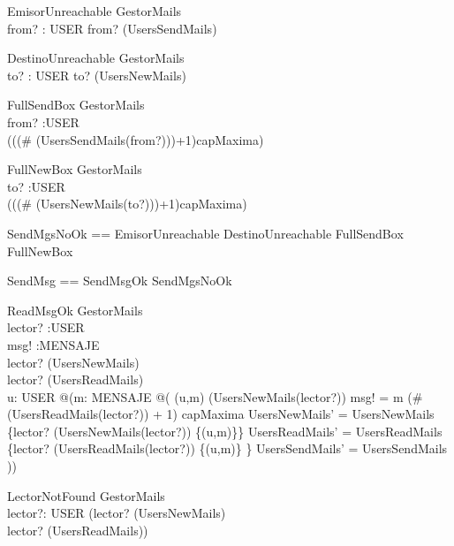\begin{schema}{EmisorUnreachable}
\Xi GestorMails \\
from? : USER
\where
from? \notin \dom(UsersSendMails)
\end{schema}

\begin{schema}{DestinoUnreachable}
\Xi GestorMails \\
to? : USER
\where
to? \notin \dom(UsersNewMails)
\end{schema}

\begin{schema}{FullSendBox}
\Xi GestorMails \\
from? :USER \\
\where
\lnot(((\# (UsersSendMails(from?)))+1)\leq capMaxima)
\end{schema}

\begin{schema}{FullNewBox}
\Xi GestorMails \\
to? :USER \\
\where
\lnot(((\# (UsersNewMails(to?)))+1)\leq capMaxima)
\end{schema}

\begin{zed}
SendMgsNoOk == EmisorUnreachable \lor DestinoUnreachable \lor FullSendBox \lor FullNewBox \\
\end{zed}
\begin{zed}
SendMsg == SendMsgOk \lor SendMgsNoOk \\
\end{zed}

\begin{schema}{ReadMsgOk}
\Delta GestorMails \\
lector? :USER\\
msg! :MENSAJE \\
\where
lector? \in \dom(UsersNewMails) \\
lector? \in \dom(UsersReadMails) \\
\exists u: USER @(\exists m: MENSAJE @(
(u,m) \in (UsersNewMails(lector?)) \land 
msg!  = m \land
(\# (UsersReadMails(lector?)) + 1) \leq capMaxima \land
UsersNewMails' =  UsersNewMails \oplus \{lector? \mapsto (UsersNewMails(lector?))  \setminus \{(u,m)\}\} \land
UsersReadMails' = UsersReadMails \oplus \{lector? \mapsto (UsersReadMails(lector?)) \cup \{(u,m)\} \} \land
UsersSendMails' = UsersSendMails ))
\end{schema}

\begin{schema}{LectorNotFound}
\Xi GestorMails \\
lector?: USER 
\where
(lector? \notin \dom(UsersNewMails) \\
\lor
lector? \notin \dom(UsersReadMails)) 
\end{schema}

